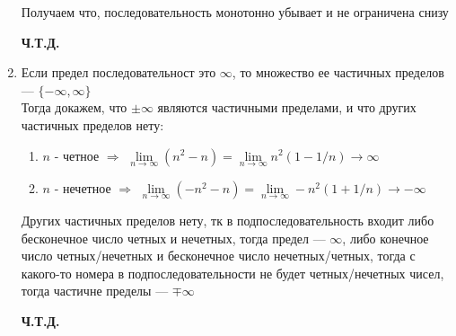 \documentclass{report}
\begin{document}
\begin{enumerate}
\begin{equation*}
		\end{equation*}
		Получаем что, последовательность монотонно убывает и не ограничена снизу
		\begin{center}
			\textbf{Ч.Т.Д.}
		\end{center}
	\item Если предел последовательност это $\infty$, то множество ее частичных пределов --- $\lbrace-\infty, \infty\rbrace$\\
	Тогда докажем, что $\pm \infty$ являются частичными пределами, и что других частичных пределов нету:
	\begin{enumerate}
		\item $n$ - четное $\Rightarrow$
			$\lim\limits_{n\to\infty} (n^2-n)=\lim\limits_{n\to\infty} n^2(1-1/n) \to \infty$

		\item $n$ - нечетное $\Rightarrow$
			$\lim\limits_{n\to\infty} (-n^2-n)=\lim\limits_{n\to\infty} -n^2(1+1/n) \to -\infty$
	\end{enumerate}
	Других частичных пределов нету, тк в подпоследовательность входит либо бесконечное число четных и нечетных, тогда предел --- $\infty$, либо конечное число четных/нечетных и бесконечное число нечетных/четных, тогда с какого-то номера в подпоследовательности не будет четных/нечетных чисел, тогда частичне пределы --- $\mp \infty$
	\begin{center}
		\textbf{Ч.Т.Д.}
	\end{center}
\end{enumerate}
\end{document}

